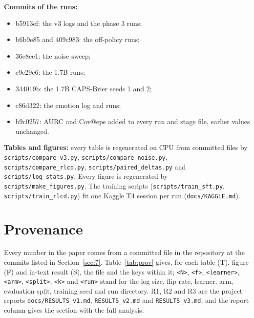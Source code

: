 \documentclass[10pt,letterpaper]{article}
\theoremstyle{plain}
\begin{document}
\textbf{Commits of the runs:}
\begin{itemize}
  \item b5913ef: the v3 logs and the phase 3 runs;
  \item b6b9e85 and 409c983: the off-policy runs;
  \item 36e8ee1: the noise sweep;
  \item c9e29c6: the 1.7B runs;
  \item 344019b: the 1.7B CAPS-Brier seeds 1 and 2;
  \item c86d322: the emotion log and runs;
  \item b9c0257: AURC and Cov@eps added to every run and stage file, earlier values unchanged.
\end{itemize}

{\sloppy \textbf{Tables and figures:} every table is regenerated on CPU from committed files by \texttt{scripts/compare\_v3.py}, \texttt{scripts/compare\_noise.py}, \texttt{scripts/compare\_rlcd.py}, \texttt{scripts/paired\_deltas.py} and \texttt{scripts/log\_stats.py}. Every figure is regenerated by \texttt{scripts/make\_figures.py}. The training scripts (\texttt{scripts/train\_sft.py}, \texttt{scripts/train\_rlcd.py}) fit one Kaggle T4 session per run (\texttt{docs/KAGGLE.md}).\par}

\clearpage
\section{Provenance}\label{sec:B}

Every number in the paper comes from a committed file in the repository at the commits listed in Section~\ref{sec:7}. Table~\ref{tab:prov} gives, for each table (T), figure (F) and in-text result (S), the file and the keys within it; \texttt{<N>}, \texttt{<f>}, \texttt{<learner>}, \texttt{<arm>}, \texttt{<split>}, \texttt{<k>} and \texttt{<run>} stand for the log size, flip rate, learner, arm, evaluation split, training seed and run directory. R1, R2 and R3 are the project reports \texttt{docs/RESULTS\_v1.md}, \texttt{RESULTS\_v2.md} and \texttt{RESULTS\_v3.md}, and the report column gives the section with the full analysis.
\end{document}
